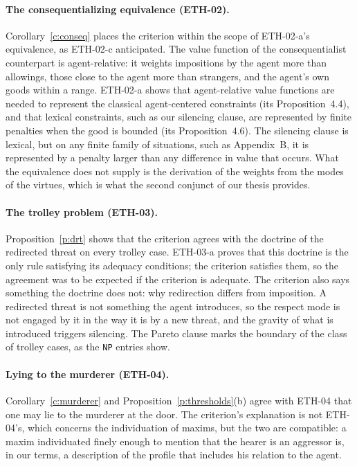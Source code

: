 \documentclass{situationist-preprint}
\begin{document}
\paragraph{The consequentializing equivalence (ETH-02).} Corollary~\ref{c:conseq} places the criterion within the scope of ETH-02-a's equivalence, as ETH-02-c anticipated. The value function of the consequentialist counterpart is agent-relative: it weights impositions by the agent more than allowings, those close to the agent more than strangers, and the agent's own goods within a range. ETH-02-a shows that agent-relative value functions are needed to represent the classical agent-centered constraints (its Proposition~4.4), and that lexical constraints, such as our silencing clause, are represented by finite penalties when the good is bounded (its Proposition~4.6). The silencing clause is lexical, but on any finite family of situations, such as Appendix~B, it is represented by a penalty larger than any difference in value that occurs. What the equivalence does not supply is the derivation of the weights from the modes of the virtues, which is what the second conjunct of our thesis provides.

\paragraph{The trolley problem (ETH-03).} Proposition~\ref{p:drt} shows that the criterion agrees with the doctrine of the redirected threat on every trolley case. ETH-03-a proves that this doctrine is the only rule satisfying its adequacy conditions; the criterion satisfies them, so the agreement was to be expected if the criterion is adequate. The criterion also says something the doctrine does not: why redirection differs from imposition. A redirected threat is not something the agent introduces, so the respect mode is not engaged by it in the way it is by a new threat, and the gravity of what is introduced triggers silencing. The Pareto clause marks the boundary of the class of trolley cases, as the \texttt{NP} entries show.

\paragraph{Lying to the murderer (ETH-04).} Corollary~\ref{c:murderer} and Proposition~\ref{p:thresholds}(b) agree with ETH-04 that one may lie to the murderer at the door. The criterion's explanation is not ETH-04's, which concerns the individuation of maxims, but the two are compatible: a maxim individuated finely enough to mention that the hearer is an aggressor is, in our terms, a description of the profile that includes his relation to the agent.
\end{document}

